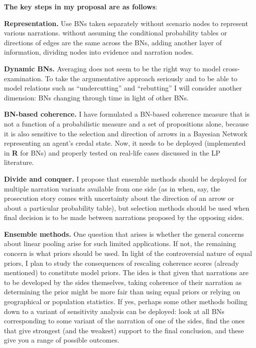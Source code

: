 \documentclass[11pt,dvipsnames,enabledeprecatedfontcommands]{scrartcl}
\begin{document}
\vspace{2mm}

\noindent \textbf{The key steps in my proposal are as follows}:

\vspace{1mm}

\noindent
\textbf{Representation.} Use BNs taken separately without scenario nodes
to represent various narrations. without assuming the conditional
probability tables or directions of edges are the same across the BNs,
adding another layer of information, dividing nodes into evidence and
narration nodes.

\noindent \textbf{Dynamic BNs.} Averaging does not seem to be the right
way to model cross-examination. To take the argumentative approach
seriously and to be able to model relations such as ``undercutting'' and
``rebutting'' I will consider another dimension: BNs changing through
time in light of other BNs.

\noindent
 \textbf{BN-based coherence.} I have formulated a BN-based coherence
measure that is not a function of a probabilistic measure and a set of
propositions alone, because it is also sensitive to the selection and
direction of arrows in a Bayesian Network representing an agent's credal
state. Now, it needs to be deployed (implemented in \textbf{\textsf{R}}
for BNs) and properly tested on real-life cases discussed in the LP
literature.

\noindent
 \textbf{Divide and conquer.} I propose that ensemble methods should be
deployed for multiple narration variants available from one side (as in
when, say, the prosecution story comes with uncertainty about the
direction of an arrow or about a particular probability table), but
selection methods should be used when final decision is to be made
between narrations proposed by the opposing sides.

\noindent
\textbf{Ensemble methods.} One question that arises is whether the
general concerns about linear pooling arise for such limited
applications. If not, the remaining concern is what priors should be
used. In light of the controversial nature of equal priors, I plan to
study the consequences of rescaling coherence scores (already mentioned)
to constitute model priors. The idea is that given that narrations are
to be developed by the sides themselves, taking coherence of their
narration as determining the prior might be more fair than using equal
priors or relying on geographical or population statistics. If yes,
perhaps some other methods boiling down to a variant of sensitivity
analysis can be deployed: look at all BNs corresponding to some variant
of the narration of one of the sides, find the ones that give strongest
(and the weakest) support to the final conclusion, and these give you a
range of possible outcomes.
\end{document}
